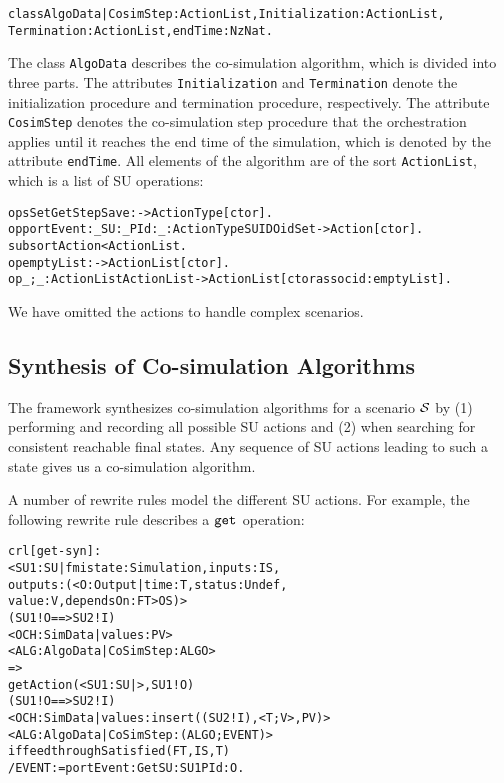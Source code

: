 \small
\begin{alltt}
class AlgoData | CosimStep : ActionList,   Initialization : ActionList, 
                 Termination : ActionList, endTime : NzNat .
\end{alltt}
\normalsize

The class \texttt{AlgoData} describes the co-simulation algorithm, which is divided into three parts.
The attributes \texttt{Initialization} and \texttt{Termination} denote the initialization procedure and termination procedure, respectively.
The attribute \texttt{CosimStep} denotes the co-simulation step procedure that the orchestration applies until it reaches the end time of the simulation, which is denoted by the attribute \texttt{endTime}.
All elements of the algorithm are of the sort \texttt{ActionList}, which is a list of SU operations:

\small
\begin{alltt}
ops Set Get Step Save : -> ActionType [ctor] . 
op portEvent:_SU:_PId:_ : ActionType SUID OidSet -> Action [ctor] .
subsort Action < ActionList .
op emptyList : -> ActionList [ctor] .
op _;_ : ActionList ActionList -> ActionList [ctor assoc id: emptyList] .
\end{alltt}
\normalsize

\noindent We have omitted the actions to handle complex scenarios.


\subsection{Synthesis of Co-simulation Algorithms}
The framework synthesizes co-simulation algorithms for a scenario $\mathcal{S}$ by (1) performing and recording all possible SU actions and (2) when searching for consistent reachable final states.
Any sequence of SU actions leading to such a state gives us a co-simulation algorithm.

A number of rewrite rules model the different SU actions.
For example, the following rewrite rule describes a $\mathtt{get}_{}$ operation:
\small
\begin{alltt}
crl [get-syn] :
    < SU1 : SU | fmistate : Simulation, inputs : IS, 
                  outputs : (< O : Output | time : T, status : Undef, 
                                            value : V, dependsOn : FT > OS) > 
    (SU1 ! O ==> SU2 ! I)
    < OCH : SimData | values : PV > 
    < ALG : AlgoData | CoSimStep : ALGO >
    => 
    getAction(< SU1 : SU | >, SU1 ! O)
    (SU1 ! O ==> SU2 ! I)
    < OCH : SimData | values : insert((SU2 ! I), < T ; V >, PV) >  
    < ALG : AlgoData | CoSimStep : (ALGO ; EVENT) >
  if feedthroughSatisfied(FT, IS, T) 
    / EVENT := portEvent: Get SU: SU1 PId: O . 
\end{alltt}
\normalsize

